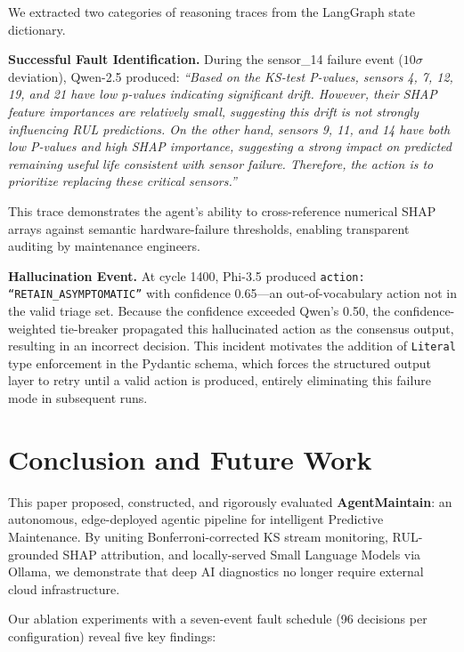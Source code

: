 \documentclass[conference, 10pt]{IEEEtran}
\begin{document}
We extracted two categories of reasoning traces from the LangGraph state dictionary.

\textbf{Successful Fault Identification.} During the sensor\_14 failure event ($10\sigma$ deviation), Qwen-2.5 produced:
\textit{``Based on the KS-test P-values, sensors 4, 7, 12, 19, and 21 have low p-values indicating significant drift. However, their SHAP feature importances are relatively small, suggesting this drift is not strongly influencing RUL predictions. On the other hand, sensors 9, 11, and 14 have both low P-values and high SHAP importance, suggesting a strong impact on predicted remaining useful life consistent with sensor failure. Therefore, the action is to prioritize replacing these critical sensors.''}

This trace demonstrates the agent's ability to cross-reference numerical SHAP arrays against semantic hardware-failure thresholds, enabling transparent auditing by maintenance engineers.

\textbf{Hallucination Event.} At cycle 1400, Phi-3.5 produced \texttt{action: ``RETAIN\_ASYMPTOMATIC''} with confidence 0.65---an out-of-vocabulary action not in the valid triage set. Because the confidence exceeded Qwen's 0.50, the confidence-weighted tie-breaker propagated this hallucinated action as the consensus output, resulting in an incorrect decision. This incident motivates the addition of \texttt{Literal} type enforcement in the Pydantic schema, which forces the structured output layer to retry until a valid action is produced, entirely eliminating this failure mode in subsequent runs.

\section{Conclusion and Future Work}

This paper proposed, constructed, and rigorously evaluated \textbf{AgentMaintain}: an autonomous, edge-deployed agentic pipeline for intelligent Predictive Maintenance. By uniting Bonferroni-corrected KS stream monitoring, RUL-grounded SHAP attribution, and locally-served Small Language Models via Ollama, we demonstrate that deep AI diagnostics no longer require external cloud infrastructure.

Our ablation experiments with a seven-event fault schedule (96 decisions per configuration) reveal five key findings:
\end{document}
